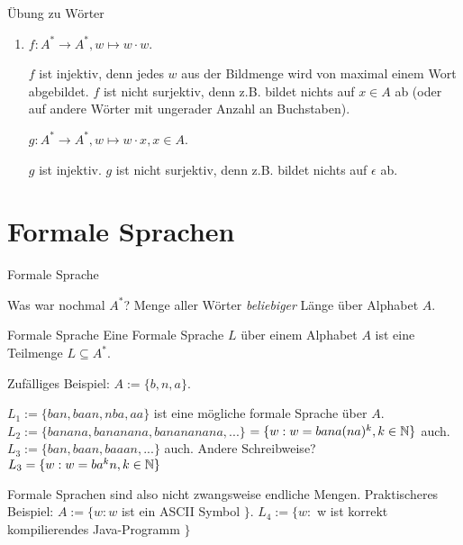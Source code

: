 \documentclass[handout]{beamer}
\begin{document}
\begin{frame}{Übung zu Wörter}
	\begin{enumerate}
		\item $f: A^* \rightarrow A^*, w \mapsto w \cdot w$.
		\begin{itemize}
			\pitem $f$ ist injektiv\pause , denn jedes $w$ aus der Bildmenge wird von maximal einem Wort abgebildet.
			\pitem $f$ ist nicht surjektiv\pause , denn z.B. bildet nichts auf $x \in A$ ab (oder auf andere Wörter mit ungerader Anzahl an Buchstaben).
		\end{itemize}
		\pitem $g: A^* \rightarrow A^*, w \mapsto w \cdot x, x \in A$.
		\begin{itemize}
			\pitem $g$ ist injektiv.
			\pitem $g$ ist nicht surjektiv\pause , denn z.B. bildet nichts auf $\epsilon$ ab.
		\end{itemize}
	\end{enumerate}
\end{frame}

\section{Formale Sprachen}

\begin{frame}{Formale Sprache}
	\begin{itemize}
		\pitem Was war nochmal $A^*$? Menge aller Wörter \emph{beliebiger} Länge über Alphabet $A$.
	\end{itemize}

	\pause
	
	\begin{block}{Formale Sprache}
		Eine Formale Sprache $L$ über einem Alphabet $A$ ist eine Teilmenge $L \subseteq A^*$.
	\end{block}

	\begin{itemize}
		\pitem Zufälliges Beispiel: \pause $A := \{b, n, a\}$.
		\begin{itemize}
			\pitem $L_1 := \{ban, baan, nba, aa\}$ ist eine mögliche formale Sprache über $A$.
			\pitem $L_2 := \{banana, bananana, banananana, ...\}$ \pause $ = \{w : w = bana(na)^k, k \in \mathbb{N}\}$ auch.
			\pitem $L_3 := \{ban, baan, baaan, ...\}$ auch. \pause Andere Schreibweise? \pause \\ $ L_3 = \{w : w = ba^kn, k \in \mathbb{N} \}$
		\end{itemize}
		\pitem Formale Sprachen sind also nicht zwangsweise endliche Mengen.
		\pitem Praktischeres Beispiel: $A := \{w : w $ ist ein ASCII Symbol $\}$.
		\pitem $L_4 := \{w : $ w ist korrekt kompilierendes Java-Programm $\}$ 
	\end{itemize}
\end{frame}
\end{document}
